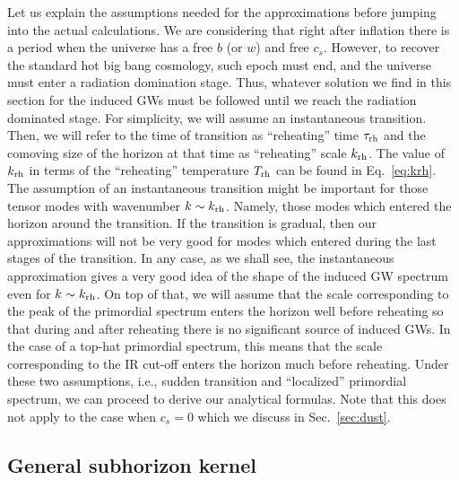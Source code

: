 \documentclass[a4paper,11pt]{article}
\numberwithin{equation}{section}
\begin{document}
Let us explain the assumptions needed for the approximations before jumping into the actual calculations. We are considering that right after inflation there is a period when the universe has a free $b$ (or $w$) and free $c_s$. However, to recover the standard hot big bang cosmology, such epoch must end, and the universe must enter a radiation domination stage. Thus, whatever solution we find in this section for the induced GWs must be followed until we reach the radiation dominated stage. For simplicity, we will assume an instantaneous transition. Then, we will refer to the time of transition as ``reheating'' time $\tau_{\rm rh}$ and the comoving size of the horizon at that time as ``reheating'' scale $k_{\rm rh}$. The value of $k_{\rm rh}$ in terms of the ``reheating'' temperature $T_{\rm rh}$ can be found in Eq.~\eqref{eq:krh}. The assumption of an instantaneous transition might be important for those tensor modes with wavenumber $k\sim k_{\rm rh}$. Namely, those modes which entered the horizon around the transition. If the transition is gradual, then our approximations will not be very good for modes which entered during the last stages of the transition. In any case, as we shall see, the instantaneous approximation gives a very good idea of the shape of the induced GW spectrum even for $k\sim k_{\rm rh}$. On top of that, we will assume that the scale corresponding to the peak of the primordial spectrum enters the horizon well before reheating so that during and after reheating there is no significant source of induced GWs. In the case of a top-hat primordial spectrum, this means that the scale corresponding to the IR cut-off enters the horizon much before reheating. Under these two assumptions, i.e., sudden transition and ``localized'' primordial spectrum, we can proceed to derive our analytical formulas. Note that this does not apply to the case when $c_s=0$ which we discuss in Sec.~\ref{sec:dust}.

\subsection{General subhorizon kernel \label{sec:subhorizonkernel}}
\end{document}
